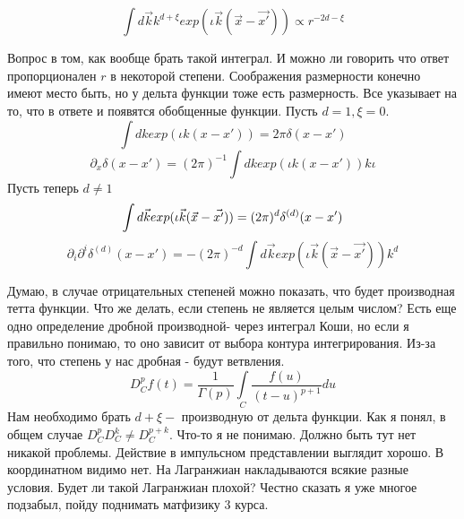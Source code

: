 \documentclass[]{article}
\title{}
\author{}
\begin{document}
\maketitle
\begin{abstract}
\end{abstract}

\section{}
\begin{equation}
\int d \vec{k} k^{d+\xi} exp (\iota \vec{k}(\vec{x}-\vec{x'}))\propto r^{-2d-\xi}
\end{equation}

Вопрос в том, как вообще брать такой интеграл. И можно ли говорить что ответ пропорционален $r$ в некоторой степени.
Соображения размерности конечно имеют место быть, но у дельта функции тоже есть размерность. Все указывает на то, что в ответе и появятся обобщенные функции.
Пусть $d=1, \xi=0$.
\begin{equation}
\int d k  exp (\iota k(x-x'))=2\pi\delta(x-x') 
\end{equation}
\begin{equation}
\partial_{x}\delta(x-x')=(2\pi)^{-1}\int dk  exp (\iota k(x-x')) k\iota
\end{equation}
Пусть теперь $d \neq 1$
\begin{equation}
\int d \vec{k} exp (\iota \vec{k}(\vec{x}-\vec{x'}))=(2\pi)^{d}\delta^{(d)}(x-x') \\
\end{equation}
\begin{equation}
\partial_{i}\partial^{i}\delta^{(d)}(x-x')=-(2\pi)^{-d}\int d \vec{k} exp (\iota \vec{k}(\vec{x}-\vec{x'}))k^d
\end{equation}

Думаю, в случае отрицательных степеней можно показать, что будет производная тетта функции.
Что же делать, если степень не является целым числом? 
Есть еще одно определение дробной производной- через интеграл Коши, но если я правильно понимаю, то оно зависит от выбора контура интегрирования. Из-за того, что степень у нас дробная - будут ветвления.
\begin{equation}
D^p_C f(t) = \frac{1}{\Gamma(p)}\int\limits_{C}\frac{f(u)}{(t-u)^{p+1}}du
\end{equation}
Нам необходимо брать $d+\xi -$ производную от дельта функции. Как я понял, в общем случае $D^p_CD^k_C\neq D^{p+k}_C$.
Что-то я не понимаю. Должно быть тут нет никакой проблемы. Действие в импульсном представлении выглядит хорошо. В координатном видимо нет. На Лагранжиан накладываются всякие разные условия. Будет ли такой Лагранжиан плохой? Честно сказать я уже многое подзабыл, пойду поднимать матфизику 3 курса.
\end{document}
